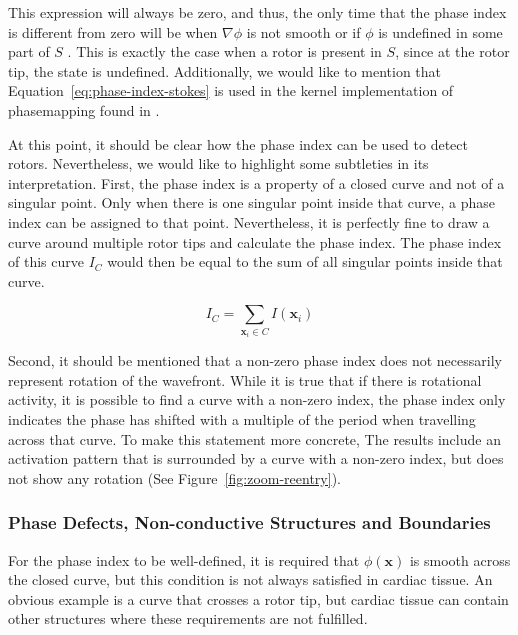 \documentclass[twocolumn]{article}
\begin{document}
\noindent This expression will always be zero,
and thus, the only time that the phase index is different from zero will be when
$\nabla \phi$ is not smooth or if $\phi$ is undefined in some part of $S$ \autocite{herlin2012reconstruction}.
This is exactly the case when a rotor is present in $S$,
since at the rotor tip, the state is undefined.
Additionally, we would like to mention that Equation~\ref{eq:phase-index-stokes}
is used in the kernel implementation of phasemapping found in \textcite{2001theoretical_convolution_method_bray}.

At this point, it should be clear how the phase index can be used to detect rotors.
Nevertheless, we would like to highlight some subtleties in its interpretation.
First, the phase index is a property of a closed curve
and not of a singular point.
Only when there is one singular point inside that curve,
a phase index can be assigned to that point.
Nevertheless, it is perfectly fine to draw a curve around multiple rotor tips
and calculate the phase index.
The phase index of this curve $I_C$ would then be equal to the sum of all singular points inside that curve.

\begin{equation}
  I_C = \sum_{\bm{x}_i\in C} I(\bm{x}_i)
  \label{eq:index-curve}
\end{equation}

Second, it should be mentioned that a non-zero phase index does not necessarily represent rotation of the wavefront.
While it is true that if there is rotational activity,
it is possible to find a curve with a non-zero index,
the phase index only indicates the phase has shifted with a multiple of the period
when travelling across that curve.
To make this statement more concrete,
The results include an activation pattern that is surrounded by a curve with a non-zero index,
but does not show any rotation (See Figure~\ref{fig:zoom-reentry}).

\subsubsection{Phase Defects, Non-conductive Structures and Boundaries}

For the phase index to be well-defined,
it is required that $\phi(\bm{x})$ is smooth across the closed curve,
but this condition is not always satisfied in cardiac tissue.
An obvious example is a curve that crosses a rotor tip,
but cardiac tissue can contain other structures
where these requirements are not fulfilled.
\end{document}

